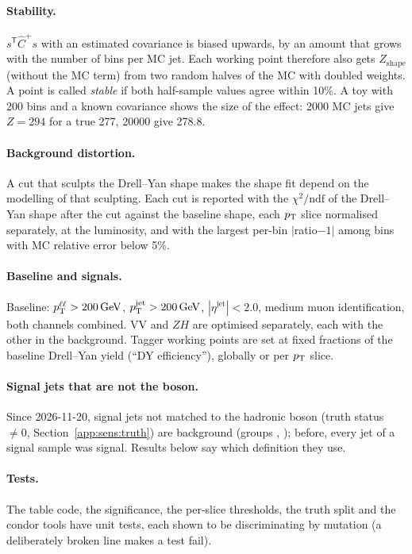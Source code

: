 \paragraph{Stability.} $s^\mathsf{T}\hat C^{+}s$ with an estimated covariance is biased upwards, by an amount that grows
with the number of bins per MC jet. Each working point therefore also gets $Z_\mathrm{shape}$ (without the MC term) from
two random halves of the MC with doubled weights. A point is called \emph{stable} if both half-sample values agree
within 10\%. A toy with 200 bins and a known covariance shows the size of the effect: 2000 MC jets give $Z = 294$ for a
true 277, 20000 give 278.8.

\paragraph{Background distortion.} A cut that sculpts the Drell--Yan shape makes the shape fit depend on the modelling of
that sculpting. Each cut is reported with the $\chi^2/\mathrm{ndf}$ of the Drell--Yan shape after the cut against the
baseline shape, each $p_{\mathrm{T}}$ slice normalised separately, at the luminosity, and with the largest per-bin $|$ratio$-1|$
among bins with MC relative error below 5\%.

\paragraph{Baseline and signals.} Baseline: $p_{\mathrm{T}}^{\ell\ell} > 200\,\mathrm{GeV}$, $p_{\mathrm{T}}^{\mathrm{jet}} > 200\,\mathrm{GeV}$, $|\eta^\mathrm{jet}| < 2.0$, medium
muon identification, both channels combined. VV and $ZH$ are optimised separately, each with the other in the
background. Tagger working points are set at fixed fractions of the baseline Drell--Yan yield (``DY efficiency''),
globally or per $p_{\mathrm{T}}$ slice.

\paragraph{Signal jets that are not the boson.} Since 2026-11-20, signal jets not matched to the hadronic boson
(truth status $\neq 0$, Section~\ref{app:sens:truth}) are background (groups , ); before,
every jet of a signal sample was signal. Results below say which definition they use.

\paragraph{Tests.} The table code, the significance, the per-slice thresholds, the truth split and the condor tools have
unit tests, each shown to be discriminating by mutation (a deliberately broken line makes a test fail).

